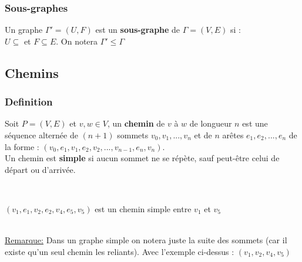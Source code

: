 \documentclass[11pt]{article}
\begin{document}
		\subsubsection{Sous-graphes}
			Un graphe $\Gamma ' = (U,F)$ est un \textbf{sous-graphe} de $\Gamma = (V,E)$ si : \\
			$U\subseteq$ et $F \subseteq E$. On notera $\Gamma ' \leq \Gamma$
	
	\subsection{Chemins}
		\subsubsection{Definition}
			Soit $P=(V,E)$ et $v,w \in V$, un \textbf{chemin} de $v$ à $w$ de longueur $n$ est une séquence alternée de $(n+1)$ sommets $v_0,v_1,...,v_n$ et de $n$ arêtes $e_1,e_2,...,e_n$ de la forme : $(v_0,e_1,v_1,e_2,v_2,...,v_{n-1},e_n,v_n)$.\\
			
			Un chemin est \textbf{simple} si aucun sommet ne se répète, sauf peut-être celui de départ ou d'arrivée.\\
			
			\begin{minipage}{0.5\textwidth}
			\centering
			 \\
			\end{minipage}\hfill
			\begin{minipage}{0.5\textwidth}
			\center
			$(v_1,e_1,v_2,e_2,v_4,e_5,v_5)$ est un chemin simple entre $v_1$ et $v_5$
			\end{minipage}\\
			
		\underline{Remarque:} Dans un graphe simple on notera juste la suite des sommets (car il existe qu'un seul chemin les reliants). Avec l'exemple ci-dessus : $(v_1,v_2,v_4,v_5)$
\end{document}
